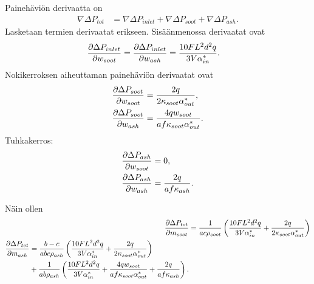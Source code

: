 Painehäviön derivaatta on
\begin{align}
    \nabla \Delta P_{tot} &=
    \nabla \Delta P_{inlet} + \nabla \Delta P_{soot} + \nabla \Delta P_{ash}.
\end{align}
Lasketaan termien derivaatat erikseen. Sisäänmenossa derivaatat ovat
\begin{align}
    \frac{\partial \Delta P_{inlet}}{\partial w_{soot}} &=
    \frac{\partial \Delta P_{inlet}}{\partial w_{ash}} =
    \frac{10 F L^2 d^2 q}{3 V \alpha_{in}^*} .
\end{align}
Nokikerroksen aiheuttaman painehäviön derivaatat ovat
\begin{align}
    \frac{\partial \Delta P_{soot}}{\partial w_{soot}} &=
    \frac{2 q}{2 \kappa_{soot} \alpha_{out}^*},
    \\\frac{\partial \Delta P_{soot}}{\partial w_{ash}}
    &=
    \frac{4qw_{soot}}{a f\kappa_{soot} \alpha_{out}^* }.
\end{align}
Tuhkakerros:
\begin{align}
    \frac{\partial \Delta P_{ash}}{\partial w_{soot}} &= 0,
    \\\frac{\partial \Delta P_{ash}}{\partial w_{ash}} &=
    \frac{2q}{a f \kappa_{ash}  }.
\end{align}

Näin ollen 
\begin{align}
    \frac{\partial \Delta P_{tot}}{\partial m_{soot}} &=
     \frac{1}{ac\rho_{soot}}
    \left(\frac{10 F L^2 d^2 q}{3 V \alpha_{in}^*} +
     \frac{2 q}{2 \kappa_{soot} \alpha_{out}^*}
    \right)\\
\begin{split}
    \frac{\partial \Delta P_{tot}}{\partial m_{ash}} &=
    \frac{b-c}{abc\rho_{ash}}\left(\frac{10 F L^2 d^2 q}{3 V \alpha_{in}^*} +
     \frac{2 q}{2 \kappa_{soot} \alpha_{out}^*}
    \right) \\
    & + 
    \frac{1}{ab\rho_{ash}} \left(
        \frac{10 F L^2 d^2 q}{3 V \alpha_{in}^*} +
        \frac{4qw_{soot}}{a f \kappa_{soot} \alpha_{out}^*  } +
        \frac{2q}{a f \kappa_{ash}  }
    \right).
\end{split}
\end{align}





